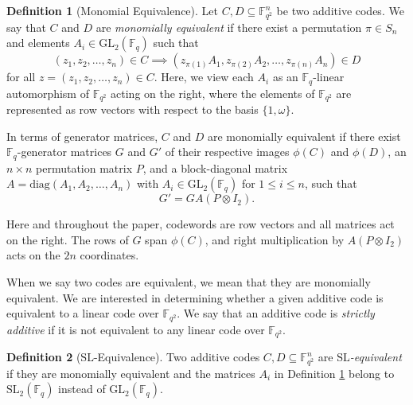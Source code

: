 \documentclass[10pt,a4paper]{amsart}
\theoremstyle{plain}
\theoremstyle{definition}
\newtheorem{definition}{Definition}[section]
\begin{document}
\setcounter{section}{2}
\setcounter{lemma}{0}
\begin{definition}[Monomial Equivalence] \label{monequiv}
Let $C, D \subseteq \mathbb{F}_{q^2}^n$ be two additive codes.
We say that $C$ and $D$ are \textit{monomially equivalent} if there exist a permutation $\pi \in S_n$ and elements $A_i \in \mathrm{GL}_2(\mathbb{F}_q)$ such that
\[
(z_1, z_2, \dots, z_n) \in C \implies (z_{\pi(1)} A_1, z_{\pi(2)} A_2, \dots, z_{\pi(n)} A_n) \in D
\]
for all $z = (z_1, z_2, \dots, z_n) \in C$. Here, we view each $A_i$ as an $\mathbb{F}_q$-linear automorphism of $\mathbb{F}_{q^2}$ acting on the right, where the elements of $\mathbb{F}_{q^2}$ are represented as row vectors with respect to the basis $\{1, \omega\}$. 

In terms of generator matrices, $C$ and $D$ are monomially equivalent if there exist $\mathbb{F}_q$-generator matrices $G$ and $G'$ of their respective images $\phi(C)$ and $\phi(D)$, an $n \times n$ permutation matrix $P$, and a block-diagonal matrix $A = \mathrm{diag}(A_1, A_2, \dots, A_n)$ with $A_i \in \mathrm{GL}_2(\mathbb{F}_q)$ for $1 \le i \le n$, such that
\begin{equation}
G' = G A (P \otimes I_2).
\end{equation}
\end{definition}

Here  and throughout the paper, codewords are row vectors and all matrices act on the right. The rows of $G$ span $\phi(C)$, and right multiplication by $A(P \otimes I_2)$ acts on the $2n$ coordinates.


When we say two codes are equivalent, we mean that they are monomially equivalent. We are interested in  determining whether a given additive code is equivalent to a linear code over $\mathbb{F}_{q^2}$. We say that an additive code is \textit{strictly additive} if it is not equivalent to any linear code over $\mathbb{F}_{q^2}$.


\begin{definition}[$\mathrm{SL}$-Equivalence] \label{slequiv}
Two additive codes $C, D \subseteq \mathbb{F}_{q^2}^n$ are \textit{$\mathrm{SL}$-equivalent} if they are monomially equivalent and the matrices $A_i$ in Definition \ref{monequiv} belong to $\mathrm{SL}_2(\mathbb{F}_q)$ instead of $\mathrm{GL}_2(\mathbb{F}_q)$.
\end{definition}

 
\end{document}
